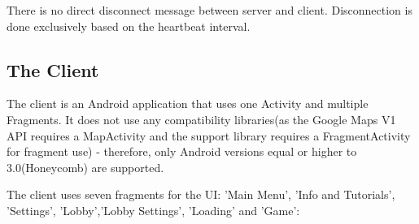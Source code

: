 \documentclass{article}
\begin{document}
There is no direct disconnect message between server and client. Disconnection
is done exclusively based on the heartbeat interval.\newline

\subsection{The Client}

The client is an Android application that uses one Activity and multiple
Fragments. It does not use any compatibility libraries(as the Google Maps V1 API
requires a MapActivity and the support library requires a FragmentActivity for
fragment use) - therefore, only Android versions equal or higher to
3.0(Honeycomb) are supported. 

The client uses seven fragments for the UI: 'Main Menu', 'Info and
Tutorials', 'Settings', 'Lobby','Lobby Settings', 'Loading' and 'Game':
\end{document}
